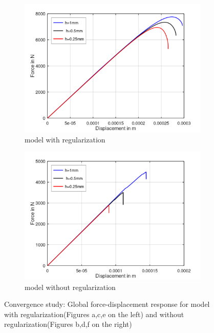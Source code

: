 \documentclass[a4paper,12pt,twoside]{report}
\begin{document}
\begin{figure}[htbp!]
     \captionsetup[subfigure]{justification=centering}
     \begin{subfigure}{0.45\textwidth}
         \includegraphics[width=1.28\textwidth]{25.FvsD.png}
         \caption{model with regularization}
         \label{fig:with regularization}
     \end{subfigure}
     \hfill
     \begin{subfigure}{0.45\textwidth}
         \includegraphics[width=1.3\textwidth]{25.FvsD2.png}
         \caption{model without regularization}
         \label{fig:without regularization}
     \end{subfigure}
    \caption{Convergence study: Global force-displacement response for model with regularization(Figures a,c,e on the left) and without regularization(Figures b,d,f on the right) }
    \label{fig:Convergence study}
\end{figure}
\FloatBarrier
 
\end{document}
